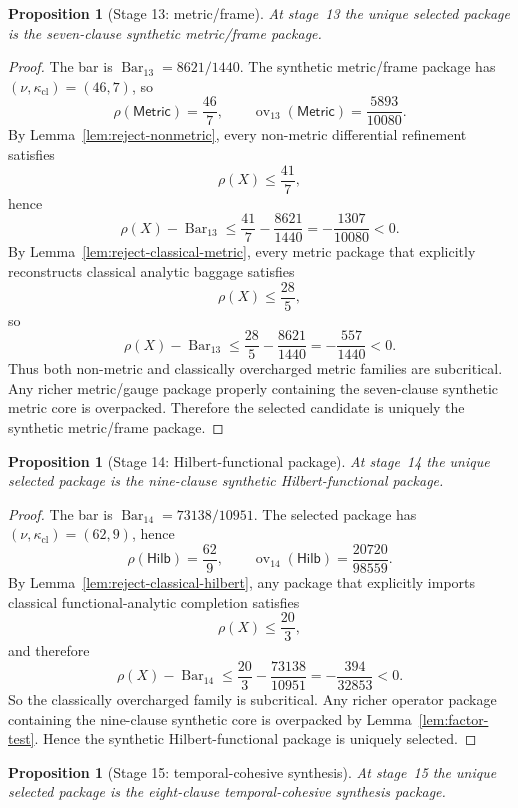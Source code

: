 \documentclass{lmcs}
\theoremstyle{plain}
\newtheorem{prop}[thm]{Proposition}
\theoremstyle{definition}
\theoremstyle{remark}
\newcommand{\SelBar}{\ensuremath{\operatorname{Bar}}}
\newcommand{\ov}{\ensuremath{\operatorname{ov}}}
\begin{document}
\begin{prop}[Stage 13: metric/frame]
\label{prop:appendix-stage13}
At stage~13 the unique selected package is the seven-clause synthetic metric/frame package.
\end{prop}

\begin{proof}
The bar is $\SelBar_{13}=8621/1440$.
The synthetic metric/frame package has $(\nu,\kappa_{\mathrm{cl}})=(46,7)$, so
\[
  \rho(\mathsf{Metric})=\frac{46}{7},\qquad
  \ov_{13}(\mathsf{Metric})=\frac{5893}{10080}.
\]
By Lemma~\ref{lem:reject-nonmetric}, every non-metric differential refinement satisfies
\[
  \rho(X)\le \frac{41}{7},
\]
hence
\[
  \rho(X)-\SelBar_{13}\le \frac{41}{7}-\frac{8621}{1440}=-\frac{1307}{10080}<0.
\]
By Lemma~\ref{lem:reject-classical-metric}, every metric package that explicitly reconstructs classical analytic baggage satisfies
\[
  \rho(X)\le \frac{28}{5},
\]
so
\[
  \rho(X)-\SelBar_{13}\le \frac{28}{5}-\frac{8621}{1440}=-\frac{557}{1440}<0.
\]
Thus both non-metric and classically overcharged metric families are subcritical.
Any richer metric/gauge package properly containing the seven-clause synthetic metric core is overpacked.
Therefore the selected candidate is uniquely the synthetic metric/frame package.
\end{proof}

\begin{prop}[Stage 14: Hilbert-functional package]
\label{prop:appendix-stage14}
At stage~14 the unique selected package is the nine-clause synthetic Hilbert-functional package.
\end{prop}

\begin{proof}
The bar is $\SelBar_{14}=73138/10951$.
The selected package has $(\nu,\kappa_{\mathrm{cl}})=(62,9)$, hence
\[
  \rho(\mathsf{Hilb})=\frac{62}{9},\qquad
  \ov_{14}(\mathsf{Hilb})=\frac{20720}{98559}.
\]
By Lemma~\ref{lem:reject-classical-hilbert}, any package that explicitly imports classical functional-analytic completion satisfies
\[
  \rho(X)\le \frac{20}{3},
\]
and therefore
\[
  \rho(X)-\SelBar_{14}\le \frac{20}{3}-\frac{73138}{10951}=-\frac{394}{32853}<0.
\]
So the classically overcharged family is subcritical.
Any richer operator package containing the nine-clause synthetic core is overpacked by Lemma~\ref{lem:factor-test}.
Hence the synthetic Hilbert-functional package is uniquely selected.
\end{proof}

\begin{prop}[Stage 15: temporal-cohesive synthesis]
\label{prop:appendix-stage15}
At stage~15 the unique selected package is the eight-clause temporal-cohesive synthesis package.
\end{prop}
\end{document}
